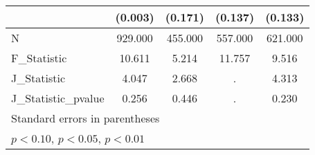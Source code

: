 {\begin{tabular}{l*{4}{c}}
            &     (0.003)         &     (0.171)         &     (0.137)         &     (0.133)         \\
\hline
N           &     929.000         &     455.000         &     557.000         &     621.000         \\
F\_Statistic &      10.611         &       5.214         &      11.757         &       9.516         \\
J\_Statistic &       4.047         &       2.668         &           .         &       4.313         \\
J\_Statistic\_pvalue&       0.256         &       0.446         &           .         &       0.230         \\
\hline\hline
\multicolumn{5}{l}{\footnotesize Standard errors in parentheses}\\
\multicolumn{5}{l}{\footnotesize \sym{*} \(p<0.10\), \sym{**} \(p<0.05\), \sym{***} \(p<0.01\)}\\
\end{tabular}
}
